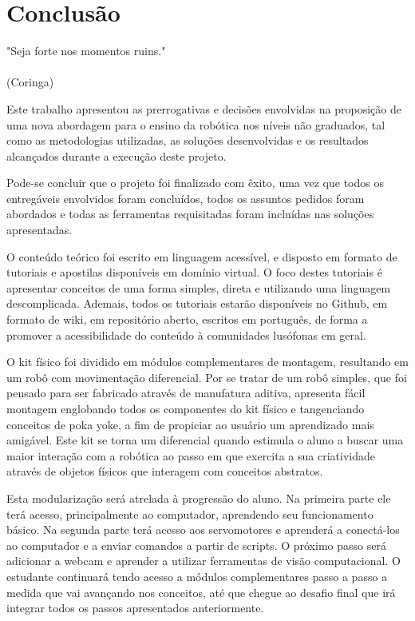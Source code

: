 \chapter{Conclusão}
\label{chap:conc}
\begin{flushright}
	"Seja forte nos momentos ruins." \\
	\ \\
	(Coringa)
\end{flushright}

Este trabalho apresentou as prerrogativas e decisões envolvidas na proposição de uma nova abordagem para o ensino da robótica nos níveis não graduados, tal como as metodologias utilizadas, as soluções desenvolvidas e os resultados alcançados durante a execução deste projeto.

Pode-se concluir que o projeto foi finalizado com êxito, uma vez que todos os entregáveis envolvidos foram concluídos, todos os assuntos pedidos foram abordados e todas as ferramentas requisitadas foram incluídas nas soluções apresentadas.

O conteúdo teórico foi escrito em linguagem acessível, e disposto em formato de tutoriais e apostilas disponíveis em domínio virtual. O foco destes tutoriais é apresentar conceitos de uma forma simples, direta e utilizando uma linguagem descomplicada. Ademais, todos os tutoriais estarão disponíveis no Github, em formato de wiki, em repositório aberto, escritos em português, de forma a promover a acessibilidade do conteúdo à comunidades lusófonas em geral.

O kit físico foi dividido em módulos complementares de montagem, resultando em um robô com movimentação diferencial. Por se tratar de um robô simples, que foi
pensado para ser fabricado através de manufatura aditiva, apresenta fácil montagem englobando todos os componentes do kit físico e tangenciando conceitos de poka yoke, a fim de propiciar ao usuário um aprendizado mais amigável. Este kit se torna um diferencial quando estimula o aluno a buscar uma maior interação com a robótica ao passo em que exercita a sua criatividade através de objetos físicos que interagem com conceitos abstratos.

Esta modularização será atrelada à progressão do aluno. Na primeira parte ele terá acesso, principalmente ao computador, aprendendo seu funcionamento básico. Na segunda parte terá acesso aos servomotores e aprenderá a conectá-los ao computador e a enviar comandos a partir de scripts. O próximo passo será adicionar a webcam e aprender a utilizar ferramentas de visão computacional. O estudante continuará tendo acesso a módulos complementares passo a passo a medida que vai avançando nos conceitos, até que chegue ao desafio final que irá integrar todos os passos apresentados anteriormente.

